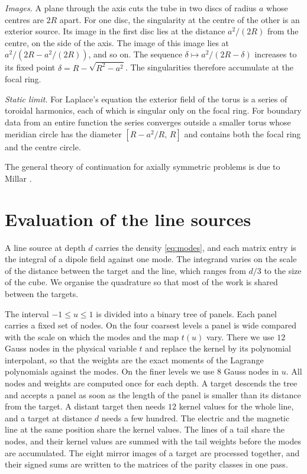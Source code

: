 \emph{Images.} A plane through the axis cuts the tube in two discs of radius $a$ whose centres are $2R$ apart. For one disc, the singularity at the centre of the other is an exterior source. Its image in the first disc lies at the distance $a^2/(2R)$ from the centre, on the side of the axis. The image of this image lies at $a^2/(2R - a^2/(2R))$, and so on. The sequence $\delta\mapsto a^2/(2R-\delta)$ increases to its fixed point $\delta = R - \sqrt{R^2-a^2}$. The singularities therefore accumulate at the focal ring.

\emph{Static limit.} For Laplace's equation the exterior field of the torus is a series of toroidal harmonics, each of which is singular only on the focal ring. For boundary data from an entire function the series converges outside a smaller torus whose meridian circle has the diameter $[R - a^2/R,\,R]$ and contains both the focal ring and the centre circle.

The general theory of continuation for axially symmetric problems is due to Millar \cite{millar1983}.

\section{Evaluation of the line sources}
\label{app:lines}

A line source at depth $d$ carries the density \eqref{eq:modes}, and each matrix entry is the integral of a dipole field against one mode. The integrand varies on the scale of the distance between the target and the line, which ranges from $d/3$ to the size of the cube. We organise the quadrature so that most of the work is shared between the targets.

The interval $-1\le u\le1$ is divided into a binary tree of panels. Each panel carries a fixed set of nodes. On the four coarsest levels a panel is wide compared with the scale on which the modes and the map $t(u)$ vary. There we use $12$ Gauss nodes in the physical variable $t$ and replace the kernel by its polynomial interpolant, so that the weights are the exact moments of the Lagrange polynomials against the modes. On the finer levels we use $8$ Gauss nodes in $u$. All nodes and weights are computed once for each depth. A target descends the tree and accepts a panel as soon as the length of the panel is smaller than its distance from the target. A distant target then needs $12$ kernel values for the whole line, and a target at distance $d$ needs a few hundred. The electric and the magnetic line at the same position share the kernel values. The lines of a tail share the nodes, and their kernel values are summed with the tail weights before the modes are accumulated. The eight mirror images of a target are processed together, and their signed sums are written to the matrices of the parity classes in one pass.

